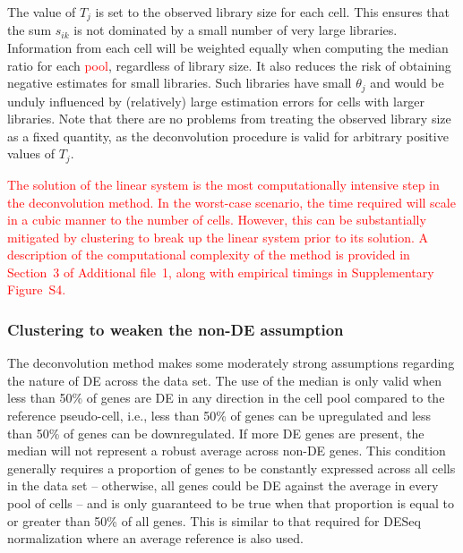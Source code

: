 \documentclass{bmcart}
\newcommand{\supptimecomp}{3}
\newcommand{\supptimings}{S4}
\newcommand{\revised}[1]{\textcolor{red}{#1}}
\begin{document}
The value of $T_j$ is set to the observed library size for each cell.
This ensures that the sum $s_{ik}$ is not dominated by a small number of very large libraries.
Information from each cell will be weighted equally when computing the median ratio for each \revised{pool}, regardless of library size.
It also reduces the risk of obtaining negative estimates for small libraries.
Such libraries have small $\theta_j$ and would be unduly influenced by (relatively) large estimation errors for cells with larger libraries.
Note that there are no problems from treating the observed library size as a fixed quantity, as the deconvolution procedure is valid for arbitrary positive values of $T_j$.

\revised{The solution of the linear system is the most computationally intensive step in the deconvolution method.
In the worst-case scenario, the time required will scale in a cubic manner to the number of cells.
However, this can be substantially mitigated by clustering to break up the linear system prior to its solution.
A description of the computational complexity of the method is provided in Section~\supptimecomp{} of Additional file~1, along with empirical timings in Supplementary Figure~\supptimings{}.}

\subsubsection*{Clustering to weaken the non-DE assumption}
The deconvolution method makes some moderately strong assumptions regarding the nature of DE across the data set.
The use of the median is only valid when less than 50\% of genes are DE in any direction in the cell pool compared to the reference pseudo-cell,
    i.e., less than 50\% of genes can be upregulated and less than 50\% of genes can be downregulated.
If more DE genes are present, the median will not represent a robust average across non-DE genes.
This condition generally requires a proportion of genes to be constantly expressed across all cells in the data set 
    -- otherwise, all genes could be DE against the average in every pool of cells -- 
    and is only guaranteed to be true when that proportion is equal to or greater than 50\% of all genes.
This is similar to that required for DESeq normalization where an average reference is also used.

\end{document}
